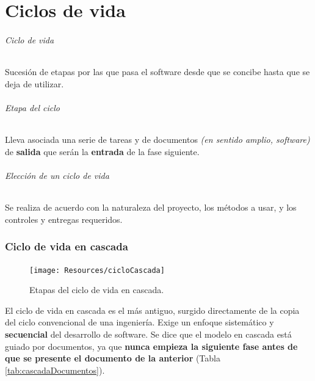 \part{Ciclos de vida}

\paragraph{Ciclo de vida}  Sucesión de etapas por las que pasa el software desde que se concibe hasta que se deja de utilizar.

\paragraph{Etapa del ciclo} Lleva asociada una serie de tareas y de documentos \textit{(en sentido amplio, software)} de \textbf{salida} que serán la \textbf{entrada} de la fase siguiente.

\paragraph{Elección de un ciclo de vida} Se realiza de acuerdo con la naturaleza del proyecto, los métodos a usar, y los controles y entregas requeridos.

\section{Ciclo de vida en cascada}
\begin{figure}[H]
   \centering
   \texttt{[image: Resources/cicloCascada]}
   \caption{Etapas del ciclo de vida en cascada.}
   \label{fig:procesoCascada}
\end{figure}
El ciclo de vida en cascada es el más antiguo, surgido directamente de la copia del ciclo convencional de una ingeniería. Exige un enfoque sistemático y \textbf{secuencial} del desarrollo de software. Se dice que el modelo en cascada está guiado por documentos, ya que \textbf{nunca empieza la siguiente fase antes de que se presente el documento de la anterior} (Tabla \ref{tab:cascadaDocumentos}).\\

